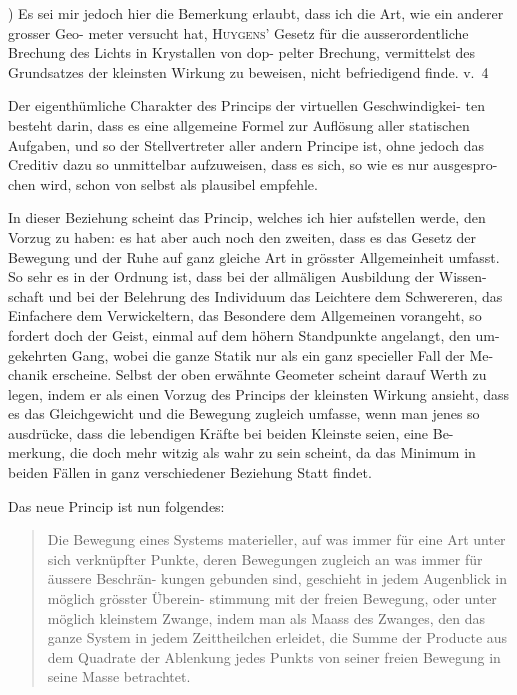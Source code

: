 \documentclass[12pt,a4paper]{article}
\theoremstyle{gauss}
\begin{document}
\vspace{8pt}
{\footnotesize *) Es sei mir jedoch hier die Bemerkung erlaubt, dass ich die Art, wie ein anderer grosser Geo-
meter versucht hat, \textsc{Huygens}' Gesetz f\"ur die ausserordentliche Brechung des Lichts in Krystallen von dop-
pelter Brechung, vermittelst des Grundsatzes der kleinsten Wirkung zu beweisen, nicht befriedigend finde.
v.~4}

\newpage
\setcounter{page}{29}

Der eigenth\"umliche Charakter des Princips der virtuellen Geschwindigkei-
ten besteht darin, dass es eine allgemeine Formel zur Aufl\"osung aller statischen
Aufgaben, und so der Stellvertreter aller andern Principe ist, ohne jedoch das
Creditiv dazu so unmittelbar aufzuweisen, dass es sich, so wie es nur ausgespro-
chen wird, schon von selbst als plausibel empfehle.

In dieser Beziehung scheint das Princip, welches ich hier aufstellen werde,
den Vorzug zu haben: es hat aber auch noch den zweiten, dass es das Gesetz der
Bewegung und der Ruhe auf ganz gleiche Art in gr\"osster Allgemeinheit umfasst.
So sehr es in der Ordnung ist, dass bei der allm\"aligen Ausbildung der Wissen-
schaft und bei der Belehrung des Individuum das Leichtere dem Schwereren, das
Einfachere dem Verwickeltern, das Besondere dem Allgemeinen vorangeht, so
fordert doch der Geist, einmal auf dem h\"ohern Standpunkte angelangt, den um-
gekehrten Gang, wobei die ganze Statik nur als ein ganz specieller Fall der Me-
chanik erscheine. Selbst der oben erw\"ahnte Geometer scheint darauf Werth zu
legen, indem er als einen Vorzug des Princips der kleinsten Wirkung ansieht,
dass es das Gleichgewicht und die Bewegung zugleich umfasse, wenn man jenes
so ausdr\"ucke, dass die lebendigen Kr\"afte bei beiden Kleinste seien, eine Be-
merkung, die doch mehr witzig als wahr zu sein scheint, da das Minimum in
beiden F\"allen in ganz verschiedener Beziehung Statt findet.

Das neue Princip ist nun folgendes:

\begin{quote}
Die Bewegung eines Systems materieller, auf was immer f\"ur eine Art unter sich
verkn\"upfter Punkte, deren Bewegungen zugleich an was immer f\"ur \"aussere Beschr\"an-
kungen gebunden sind, geschieht in jedem Augenblick in m\"oglich gr\"osster \"Uberein-
stimmung mit der freien Bewegung, oder unter m\"oglich kleinstem Zwange, indem man
als Maass des Zwanges, den das ganze System in jedem Zeittheilchen erleidet, die
Summe der Producte aus dem Quadrate der Ablenkung jedes Punkts von seiner freien
Bewegung in seine Masse betrachtet.
\end{quote}
\end{document}
